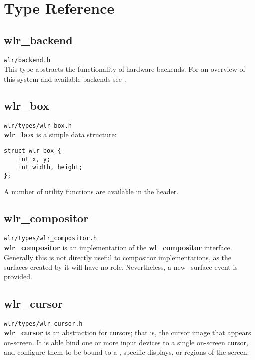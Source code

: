 \documentclass{article}
\newcommand{\code}[1]{\texttt{#1}}
\begin{document}
\newpage
\section{Type Reference}\label{type reference}

\subsection{wlr_backend}\label{wlr backend}

\code{wlr/backend.h}\\

This type abstracts the functionality of hardware backends. For an overview of
this system and available backends see .

\subsection{wlr_box}\label{wlr box}

\code{wlr/types/wlr_box.h}\\

\textbf{wlr_box} is a simple data structure:

\begin{verbatim}
struct wlr_box {
    int x, y;
    int width, height;
};
\end{verbatim}

A number of utility functions are available in the header.

\subsection{wlr_compositor}\label{wlr compositor}

\code{wlr/types/wlr_compositor.h}\\

\textbf{wlr_compositor} is an implementation of the \textbf{wl_compositor}
interface. Generally this is not directly useful to compositor implementations,
as the surfaces created by it will have no role. Nevertheless, a new_surface
event is provided.

\subsection{wlr_cursor}\label{wlr cursor}

\code{wlr/types/wlr_cursor.h}\\

\textbf{wlr_cursor} is an abstraction for cursors; that is, the cursor image
that appears on-screen. It is able bind one or more input devices to a single
on-screen cursor, and configure them to be bound to a , specific displays, or regions of the screen.
\end{document}
